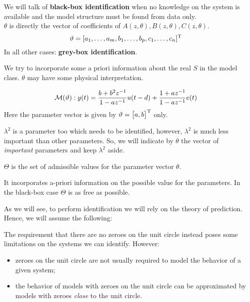 We will talk of \textbf{black-box identification} when no knowledge on the system is available and the model structure must be found from data only.\\
$\theta$ is directly the vector of coefficients of $A(z, \theta),B(z, \theta),C(z, \theta)$.
$$
	\vartheta=[a_{1},\ldots,a_{m},b_{1},\ldots,b_{p},c_{1},\ldots,c_{n}]^{\mathrm{T}}
$$
In all other cases: \textbf{grey-box identification}.

We try to incorporate some a priori information about the real $S$ in the model class. $\theta$ may have some physical interpretation.

\begin{example}
$$
	\mathcal{M}(\vartheta): y(t)=\frac{b+b^{2} z^{-1}}{1-a z^{-1}} u(t-d)+\frac{1+a z^{-1}}{1-a z^{-1}} e(t)
$$
Here the parameter vector is given by $\vartheta=\begin{bmatrix}a,b\end{bmatrix}^{\mathrm{T}}$ only.
\end{example}

\begin{obs}
$\lambda^2$ is a parameter too which needs to be identified, however, $\lambda^2$ is much less important than other parameters. So, we will indicate by $\theta$ the vector of \emph{important} parameters and keep $\lambda^2$ aside.
\end{obs}

$\Theta$ is the set of admissible values for the parameter vector $\theta$.

It incorporates a-priori information on the possible value for the parameters. In the black-box case $\Theta$ is as free as possible.

As we will see, to perform identification we will rely on the theory of prediction. Hence, we will assume the following:


The requirement that there are no zeroes on the unit circle instead poses some limitations on the systems we can identify. However:
\begin{itemize}
	\item zeroes on the unit circle are not usually required to model the behavior of a given system;
	\item the behavior of models with zeroes on the unit circle can be approximated by models with zeroes \emph{close} to the unit circle.
\end{itemize} 

